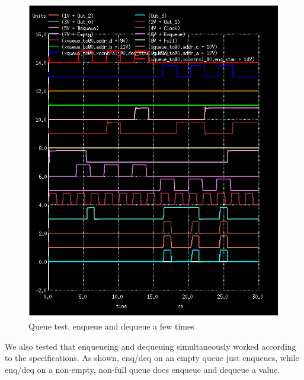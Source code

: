 \documentclass[12pt]{report}
\begin{document}
\begin{figure}[H]
  \centering
    \includegraphics[width=1.0\textwidth]{queue_toplevel_test_enq_deq_a_few_time.PNG}
  \caption{Queue test, enqueue and dequeue a few times}
\end{figure}

We also tested that enqueueing and dequeuing simultaneously worked according to the specifications. As shown, enq/deq on an empty queue just enqueues, while enq/deq on a non-empty, non-full queue does enqueue and dequeue a value.
\end{document}
